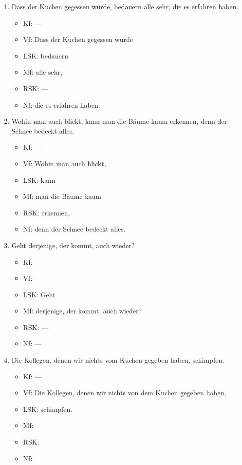 \begin{enumerate}
  \item Dass der Kuchen gegessen wurde, bedauern alle sehr, die es erfahren haben.
    \begin{itemize}
      \item Kf: ---
      \item Vf: Dass der Kuchen gegessen wurde
      \item LSK: bedauern
      \item Mf: alle sehr,
      \item RSK: ---
      \item Nf: die es erfahren haben.
    \end{itemize}
  \item Wohin man auch blickt, kann man die Bäume kaum erkennen, denn der Schnee bedeckt alles.
    \begin{itemize}
      \item Kf: ---
      \item Vf: Wohin man auch blickt,
      \item LSK: kann
      \item Mf: man die Bäume kaum
      \item RSK: erkennen,
      \item Nf: denn der Schnee bedeckt alles.
    \end{itemize}
  \item Geht derjenige, der kommt, auch wieder?
    \begin{itemize}
      \item Kf: ---
      \item Vf: ---
      \item LSK: Geht
      \item Mf: derjenige, der kommt, auch wieder?
      \item RSK: ---
      \item Nf: ---
    \end{itemize}
  \item Die Kollegen, denen wir nichts vom Kuchen gegeben haben, schimpfen.
    \begin{itemize}
      \item Kf: ---
      \item Vf: Die Kollegen, denen wir nichts von dem Kuchen gegeben haben,
      \item LSK: schimpfen.
      \item Mf: 
      \item RSK: 
      \item Nf: 
    \end{itemize}

\end{enumerate}
